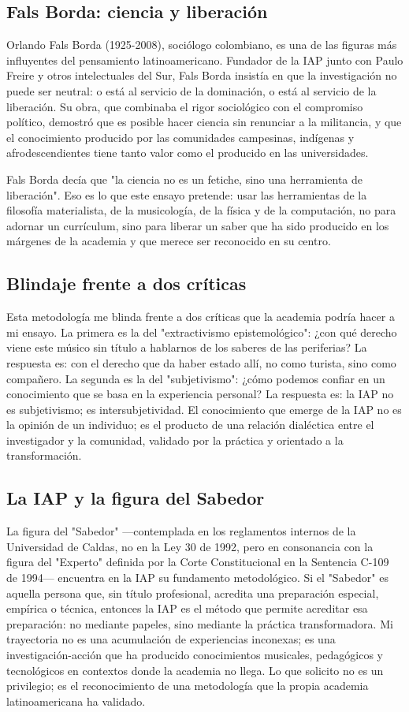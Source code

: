 \documentclass[14pt, a4paper]{article}
\begin{document}
\subsection{Fals Borda: ciencia y liberación}
\label{fals-borda}
Orlando Fals Borda (1925-2008), sociólogo colombiano, es una de las
figuras más influyentes del pensamiento latinoamericano. Fundador de
la IAP junto con Paulo Freire y otros intelectuales del Sur, Fals
Borda insistía en que la investigación no puede ser neutral: o está
al servicio de la dominación, o está al servicio de la liberación. Su
obra, que combinaba el rigor sociológico con el compromiso político,
demostró que es posible hacer ciencia sin renunciar a la militancia,
y que el conocimiento producido por las comunidades campesinas,
indígenas y afrodescendientes tiene tanto valor como el producido en
las universidades.

Fals Borda decía que "la ciencia no es un fetiche, sino una
herramienta de liberación". Eso es lo que este ensayo pretende: usar
las herramientas de la filosofía materialista, de la musicología, de
la física y de la computación, no para adornar un currículum, sino
para liberar un saber que ha sido producido en los márgenes de la
academia y que merece ser reconocido en su centro.
\subsection{Blindaje frente a dos críticas}
\label{blindaje-criticas}
Esta metodología me blinda frente a dos críticas que la academia
podría hacer a mi ensayo. La primera es la del "extractivismo
epistemológico": ¿con qué derecho viene este músico sin título a
hablarnos de los saberes de las periferias? La respuesta es: con el
derecho que da haber estado allí, no como turista, sino como
compañero. La segunda es la del "subjetivismo": ¿cómo podemos confiar
en un conocimiento que se basa en la experiencia personal? La
respuesta es: la IAP no es subjetivismo; es intersubjetividad. El
conocimiento que emerge de la IAP no es la opinión de un individuo;
es el producto de una relación dialéctica entre el investigador y la
comunidad, validado por la práctica y orientado a la transformación.
\subsection{La IAP y la figura del Sabedor}
\label{iap-sabedor}
La figura del "Sabedor" —contemplada en los reglamentos internos de la
Universidad de Caldas, no en la Ley 30 de 1992, pero en consonancia
con la figura del "Experto" definida por la Corte Constitucional en la
Sentencia C-109 de 1994— encuentra en la IAP su fundamento
metodológico. Si el "Sabedor" es aquella persona que, sin título
profesional, acredita una preparación especial, empírica o técnica,
entonces la IAP es el método que permite acreditar esa preparación: no
mediante papeles, sino mediante la práctica transformadora. Mi
trayectoria no es una acumulación de experiencias inconexas; es una
investigación-acción que ha producido conocimientos musicales,
pedagógicos y tecnológicos en contextos donde la academia no llega. Lo
que solicito no es un privilegio; es el reconocimiento de una
metodología que la propia academia latinoamericana ha validado.
\end{document}
